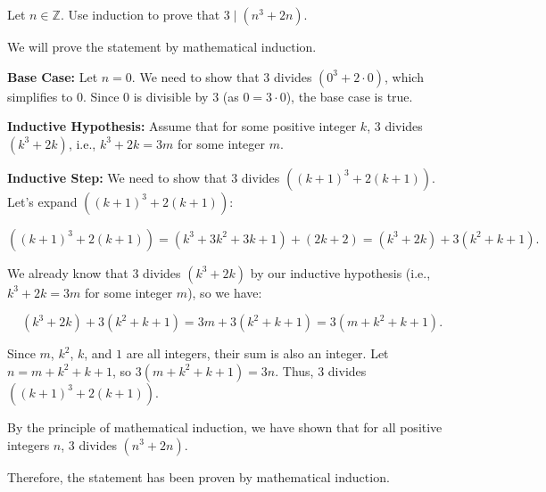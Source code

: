 \documentclass{article}
\newcommand{\Z}{\mathbb{Z}}
\theoremstyle{definition}
\begin{document}
\begin{question}
    Let $n\in \Z$. Use induction to prove that $3 \mid (n^3+2n)$. 
\end{question}
\begin{solution}
We will prove the statement by mathematical induction.

\textbf{Base Case:} Let $n = 0$. We need to show that $3$ divides $(0^3 + 2 \cdot 0)$, which simplifies to $0$. Since $0$ is divisible by $3$ (as $0 = 3 \cdot 0$), the base case is true.

\textbf{Inductive Hypothesis:} Assume that for some positive integer $k$, $3$ divides $(k^3 + 2k)$, i.e., $k^3 + 2k = 3m$ for some integer $m$.

\textbf{Inductive Step:} We need to show that $3$ divides $((k + 1)^3 + 2(k + 1))$. Let's expand $((k + 1)^3 + 2(k + 1))$:

\[
((k + 1)^3 + 2(k + 1)) = (k^3 + 3k^2 + 3k + 1) + (2k + 2) = (k^3 + 2k) + 3(k^2 + k + 1).
\]

We already know that $3$ divides $(k^3 + 2k)$ by our inductive hypothesis (i.e., $k^3 + 2k = 3m$ for some integer $m$), so we have:

\[
(k^3 + 2k) + 3(k^2 + k + 1) = 3m + 3(k^2 + k + 1) = 3(m + k^2 + k + 1).
\]

Since $m$, $k^2$, $k$, and $1$ are all integers, their sum is also an integer. Let $n = m + k^2 + k + 1$, so $3(m + k^2 + k + 1) = 3n$. Thus, $3$ divides $((k + 1)^3 + 2(k + 1))$.

By the principle of mathematical induction, we have shown that for all positive integers $n$, $3$ divides $(n^3 + 2n)$.

Therefore, the statement has been proven by mathematical induction.
\end{solution}
\end{document}

